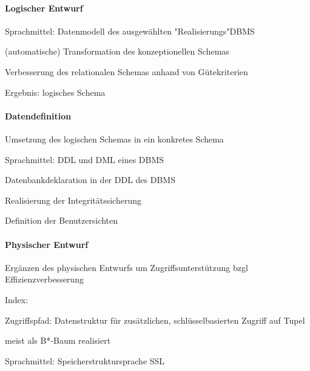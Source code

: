 \documentclass[a4paper]{article}
\begin{document}
\begin{multicols}{3}
    \paragraph{Logischer Entwurf}
    \begin{itemize*}
        \item Sprachmittel: Datenmodell des ausgewählten "Realisierungs"DBMS
        \begin{enumerate*}
            \item (automatische) Transformation des konzeptionellen Schemas
            \item Verbesserung des relationalen Schemas anhand von Gütekriterien
        \end{enumerate*}
        \item Ergebnis: logisches Schema
    \end{itemize*}

    \paragraph{Datendefinition}
    \begin{itemize*}
        \item Umsetzung des logischen Schemas in ein konkretes Schema
        \item Sprachmittel: DDL und DML eines DBMS
        \begin{itemize*}
            \item Datenbankdeklaration in der DDL des DBMS
            \item Realisierung der Integritätssicherung
            \item Definition der Benutzersichten
        \end{itemize*}
    \end{itemize*}

    \paragraph{Physischer Entwurf}
    \begin{itemize*}
        \item Ergänzen des physischen Entwurfs um Zugriffsunterstützung bzgl Effizienzverbesserung
        \item Index:
        \begin{itemize*}
            \item Zugriffspfad: Datenstruktur für zusätzlichen, schlüsselbasierten Zugriff auf Tupel
            \item meist als B*-Baum realisiert
        \end{itemize*}
        \item Sprachmittel: Speicherstruktursprache SSL
    \end{itemize*}


\end{multicols}
\end{document}
